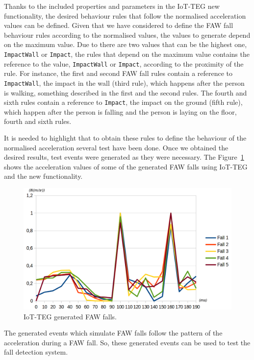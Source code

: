 \documentclass[review]{elsarticle}
\begin{document}
Thanks to the included properties and parameters in the IoT-TEG new functionality, the desired behaviour rules that
follow the normalised acceleration values can be defined. Given that we have considered to define the FAW fall behaviour
rules according to the normalised values, the values to generate depend on the maximum value. Due to there are two 
values that can be the highest one, \texttt{ImpactWall} or \texttt{Impact}, the rules that depend on the maximum 
value contains the reference to the value, \texttt{ImpactWall} or \texttt{Impact}, according to the proximity
of the rule. For instance, the first and second FAW fall rules contain a reference to \texttt{ImpactWall}, the impact 
in the wall (third rule), which happens after the person is walking, something described in the first and the second rules.
The fourth and sixth rules contain a reference to \texttt{Impact}, the impact on the ground (fifth rule), which happen
after the person is falling and the person is laying on the floor, fourth and sixth rules.

It is needed to highlight that to obtain these rules to define the behaviour of the normalised acceleration several test
have been done. Once we obtained the desired results, test events were generated as they were necessary. The 
Figure~\ref{fig:IoTTEGFAWGeneratedEvents} shows the acceleration values of some of the generated FAW falls using
IoT-TEG and the new functionality.

\begin{figure}[!ht]
  \centering
  \includegraphics[scale=0.2]{img/IoTTEGFAWGeneratedEvents}
  \caption[IoT-TEG generated FAW falls]{IoT-TEG generated FAW falls.}
  \label{fig:IoTTEGFAWGeneratedEvents}
\end{figure}

The generated events which simulate FAW falls follow the pattern of the acceleration during a FAW fall.
So, these generated events can be used to test the fall detection system.
\end{document}
